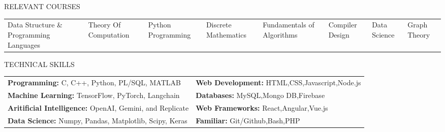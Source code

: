 \documentclass{resume} %
\begin{document}
\begin{rSection}{RELEVANT COURSES \hfill{\textmd{}}}
\begin{tabular}{p{6.5cm}|p{4.0cm}|p{4.3cm}|p{5.1cm}}
Data Structure \& Programming Languages & Theory Of Computation & Python Programming & Discrete Mathematics & Fundamentals of Algorithms & Compiler Design & Data Science & Graph Theory
 \end{tabular}
\end{rSection}
\begin{rSection}{TECHNICAL SKILLS}
\begin{tabular}{p{9.2cm}|p{10cm}}
\textbf{Programming:}  C, C++, Python, PL/SQL, MATLAB & \textbf{Web Development:} HTML,CSS,Javascript,Node.js
\sectionsep \\
\textbf{Machine Learning:} TensorFlow, PyTorch, Langchain & \textbf{Databases:} MySQL,Mongo DB,Firebase
\sectionsep \\
\textbf{Aritificial Intelligence:}  OpenAI, Gemini, and Replicate &
\textbf{Web Frameworks:} React,Angular,Vue.js
\sectionsep \\
\textbf{Data Science:} Numpy, Pandas, Matplotlib, Scipy, Keras &
\textbf{Familiar:} Git/Github,Bash,PHP



\end{tabular}

\end{rSection}
\end{document}
